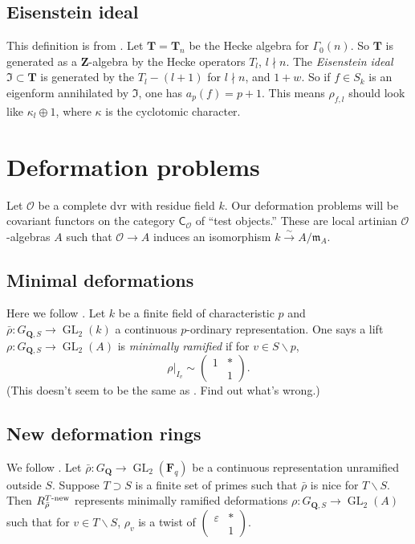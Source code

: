 \documentclass{amsart}
\DeclareMathOperator{\GL}{GL}
\newcommand{\cO}{\mathcal{O}}
\newcommand{\dF}{\mathbf{F}}
\newcommand{\dQ}{\mathbf{Q}}
\newcommand{\dT}{\mathbf{T}}
\newcommand{\dZ}{\mathbf{Z}}
\newcommand{\fI}{\mathfrak{I}}
\newcommand{\fm}{\mathfrak{m}}
\newcommand{\iso}{\xrightarrow\sim}
\begin{document}
\subsection{Eisenstein ideal}

This definition is from \cite[II.9]{mazur-1977}. Let $\dT=\dT_n$ be the Hecke 
algebra for $\Gamma_0(n)$. So $\dT$ is generated as a $\dZ$-algebra by the 
Hecke operators $T_l$, $l\nmid n$. The \emph{Eisenstein ideal} 
$\fI\subset \dT$ is generated by the $T_l-(l+1)$ for $l\nmid n$, and 
$1+w$. So if $f\in S_k$ is an eigenform annihilated by $\fI$, one has 
$a_p(f) = p+1$. This means $\rho_{f,l}$ should look like 
$\kappa_l\oplus 1$, where $\kappa$ is the cyclotomic character. 





\section{Deformation problems}

Let $\cO$ be a complete dvr with residue field $k$. Our deformation problems 
will be covariant functors on the category $\mathsf{C}_\cO$ of ``test 
objects.'' These are local artinian $\cO$-algebras $A$ such that 
$\cO\to A$ induces an isomorphism $k\iso A/\fm_A$. 


\subsection{Minimal deformations}

Here we follow \cite[\S2.1]{khare-2003}. Let $k$ be a finite field of 
characteristic $p$ and $\bar\rho:G_{\dQ,S}\to \GL_2(k)$ a continuous 
$p$-ordinary representation. One says a lift $\rho:G_{\dQ,S}\to \GL_2(A)$ is 
\emph{minimally ramified} if for $v\in S\smallsetminus p$, 
\[
  \rho|_{I_v}\sim \begin{pmatrix} 1 & \ast \\ & 1 \end{pmatrix} .
\]
\textsf{(This doesn't seem to be the same as 
\cite[p.180]{khare-ramakrishna-2003}. Find out what's wrong.)}


\subsection{New deformation rings}

We follow \cite[df.1]{khare-ramakrishna-2003}. 
Let $\bar\rho:G_\dQ\to \GL_2(\dF_q)$ be a continuous representation unramified 
outside $S$. Suppose $T\supset S$ is a finite set of primes such that 
$\bar\rho$ is nice for $T\smallsetminus S$. Then 
$R_{\bar\rho}^{T\textnormal{-new}}$ represents minimally ramified deformations 
$\rho:G_{\dQ,S} \to \GL_2(A)$ such that for $v\in T\smallsetminus S$, 
$\rho_v$ is a twist of $\begin{pmatrix} \varepsilon & \ast \\ & 1 \end{pmatrix}$. 
\end{document}
